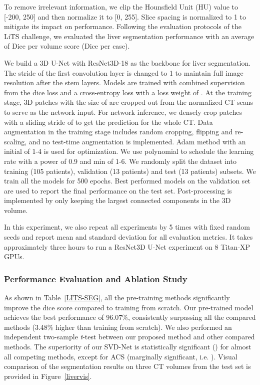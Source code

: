 \documentclass[journal,twoside,web]{ieeecolor}
\begin{document}
To remove irrelevant information, we clip the Hounsfield Unit (HU) value to [-200, 250] and then normalize it to [0, 255]. Slice spacing is normalized to 1  to mitigate its impact on performance. Following the evaluation protocols of the LiTS challenge, we evaluated the liver segmentation performance with an average of Dice per volume score (Dice per case). 

We build a 3D U-Net with ResNet3D-18 as the backbone for liver segmentation. The stride of the first convolution layer is changed to 1 to maintain full image resolution after the stem layers. Models are trained with combined supervision from the dice loss and a cross-entropy loss with a loss weight of . At the training stage, 3D patches with the size of  are cropped out from the normalized CT scans to serve as the network input. For network inference, we densely crop  patches with a sliding stride of  to get the prediction for the whole CT. Data augmentation in the training stage includes random cropping, flipping and re-scaling, and no test-time augmentation is implemented. Adam method with an initial  of 1-4 is used for optimization. We use polynomial to schedule the learning rate with a power of 0.9 and min  of 1-6. We randomly split the dataset into training (105 patients), validation (13 patients) and test (13 patients) subsets. We train all the models for 500 epochs. Best performed models on the validation set are used to report the final performance on the test set. Post-processing is implemented by only keeping the largest connected components in the 3D volume. 

In this experiment, we also repeat all experiments by 5 times with fixed random seeds and report mean and standard deviation for all evaluation metrics. It takes approximately three hours to run a ResNet3D U-Net experiment on 8 Titan-XP GPUs. 


\subsubsection{Performance Evaluation and Ablation Study}
As shown in Table~\ref{LITS-SEG}, all the pre-training methods significantly improve the dice score compared to training from scratch. Our pre-trained model achieves the best performance of 96.07\%, consistently surpassing all the compared methods (3.48\% higher than training from scratch). We also performed an independent two-sample \textit{t}-test between our proposed method and other compared methods. The superiority of our SVD-Net is statistically significant () for almost all competing methods, except for ACS (marginally significant, i.e. ). Visual comparison of the segmentation results on three CT volumes from the test set is provided in Figure~\ref{livervis}.
\end{document}
